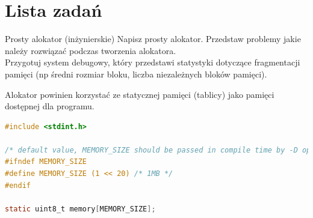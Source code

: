 \section{Lista zadań}

\begin{exercise}{Prosty alokator (inżynierskie)}{}
Napisz prosty alokator. Przedstaw problemy jakie należy rozwiązać podczas tworzenia alokatora. \\
Przygotuj system debugowy, który przedstawi statystyki dotyczące fragmentacji pamięci (np średni rozmiar bloku, liczba niezależnych bloków pamięci).

Alokator powinien korzystać ze statycznej pamięci (tablicy) jako pamięci dostępnej dla programu.

\begin{lstlisting}[language=C,style=C99]
#include <stdint.h>

/* default value, MEMORY_SIZE should be passed in compile time by -D option */
#ifndef MEMORY_SIZE
#define MEMORY_SIZE (1 << 20) /* 1MB */
#endif

static uint8_t memory[MEMORY_SIZE];
\end{lstlisting}
\end{exercise}

